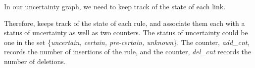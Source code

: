 In our uncertainty graph, we need to keep track of the state of each link.  
%
%
%
%
%

Therefore, \name keeps track of the state of each rule, and associate
them each with a status of uncertainty as well as two counters.  The status of
uncertainty could be one in the set \{\emph{uncertain, certain, pre-certain, unknown}\}. 
The counter, \emph{add\_cnt}, records the number of
insertions of the rule, and the counter, \emph{del\_cnt} records the number of
deletions. 


